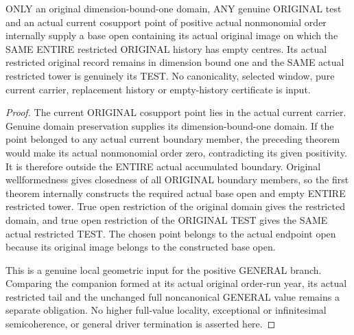 \begin{theorem}
\label{hir:original-any-test-positive-curve-actual-empty-window}
\leanok
ONLY an original dimension-bound-one domain, ANY genuine ORIGINAL test
and an actual current cosupport point of positive actual nonmonomial
order internally supply a base open containing its actual original
image on which the SAME ENTIRE restricted ORIGINAL history has empty
centres. Its actual restricted original record remains in dimension
bound one and the SAME actual restricted tower is genuinely its TEST.
No canonicality, selected window, pure current carrier, replacement
history or empty-history certificate is input.
\end{theorem}
\begin{proof}
The current ORIGINAL cosupport point lies in the actual current carrier.
Genuine domain preservation supplies its dimension-bound-one domain.
If the point belonged to any actual current boundary member, the
preceding theorem would make its actual nonmonomial order zero,
contradicting its given positivity. It is therefore outside the ENTIRE
actual accumulated boundary. Original wellformedness gives closedness of
all ORIGINAL boundary members, so the first theorem internally constructs
the required actual base open and empty ENTIRE restricted tower. True
open restriction of the original domain gives the restricted domain, and
true open restriction of the ORIGINAL TEST gives the SAME actual
restricted TEST. The chosen point belongs to the actual endpoint open
because its original image belongs to the constructed base open.

This is a genuine local geometric input for the positive GENERAL branch.
Comparing the companion formed at its actual original order-run year,
its actual restricted tail and the unchanged full noncanonical GENERAL
value remains a separate obligation. No higher full-value locality,
exceptional or infinitesimal semicoherence, or general driver termination
is asserted here.
\end{proof}
